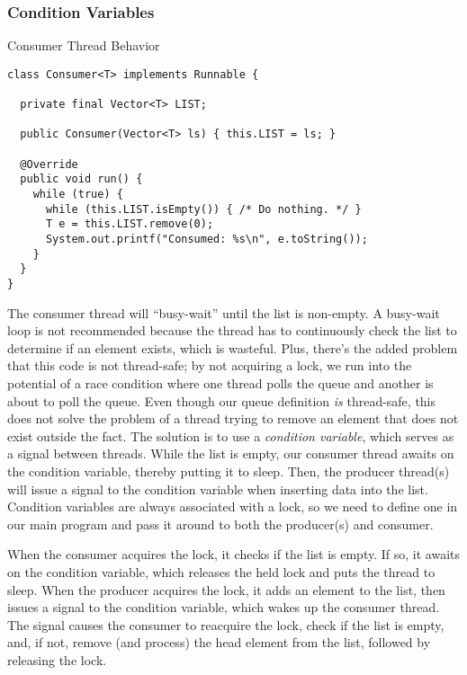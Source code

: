 \subsubsection*{Condition Variables}


\begin{cl}{Consumer Thread Behavior}
\begin{lstlisting}[language=MyJava]
class Consumer<T> implements Runnable {

  private final Vector<T> LIST;

  public Consumer(Vector<T> ls) { this.LIST = ls; }

  @Override
  public void run() {
    while (true) {
      while (this.LIST.isEmpty()) { /* Do nothing. */ }
      T e = this.LIST.remove(0);
      System.out.printf("Consumed: %s\n", e.toString());
    }
  }
}
\end{lstlisting}
\end{cl}

The consumer thread will ``busy-wait'' until the list is non-empty. A busy-wait loop is not recommended because the thread has to continuously check the list to determine if an element exists, which is wasteful. Plus, there's the added problem that this code is not thread-safe; by not acquiring a lock, we run into the potential of a race condition where one thread polls the queue and another is about to poll the queue. Even though our queue definition \textit{is} thread-safe, this does not solve the problem of a thread trying to remove an element that does not exist outside the fact. The solution is to use a \textit{condition variable}, which serves as a signal between threads. While the list is empty, our consumer thread awaits on the condition variable, thereby putting it to sleep. Then, the producer thread(s) will issue a signal to the condition variable when inserting data into the list. Condition variables are always associated with a lock, so we need to define one in our main program and pass it around to both the producer(s) and consumer. 

When the consumer acquires the lock, it checks if the list is empty. If so, it awaits on the condition variable, which releases the held lock and puts the thread to sleep. When the producer acquires the lock, it adds an element to the list, then issues a signal to the condition variable, which wakes up the consumer thread. The signal causes the consumer to reacquire the lock, check if the list is empty, and, if not, remove (and process) the head element from the list, followed by releasing the lock.

